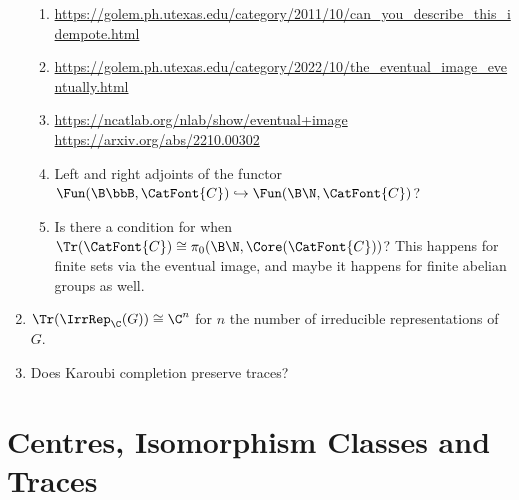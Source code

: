 \begin{enumerate}
\begin{enumerate}
            \item \url{https://golem.ph.utexas.edu/category/2011/10/can_you_describe_this_idempote.html}
            \item \url{https://golem.ph.utexas.edu/category/2022/10/the_eventual_image_eventually.html}
            \item \url{https://ncatlab.org/nlab/show/eventual+image}
                \url{https://arxiv.org/abs/2210.00302}
            \item Left and right adjoints of the functor $\Fun(\B\bbB,\CatFont{C})\hookrightarrow\Fun(\B\N,\CatFont{C})$?
            \item Is there a condition for when $\Tr(\CatFont{C})\cong\pi_{0}(\B\N,\Core(\CatFont{C}))$? This happens for finite sets via the eventual image, and maybe it happens for finite abelian groups as well.
        \end{enumerate}
    \item $\Tr(\IrrRep_{\C}(G))\cong\C^{n}$ for $n$ the number of irreducible representations of $G$.
    \item Does Karoubi completion preserve traces?
\end{enumerate}

\ChapterTableOfContents

\section{Centres, Isomorphism Classes and Traces}\label{section-centres-isomorphism-classes-and-traces}
